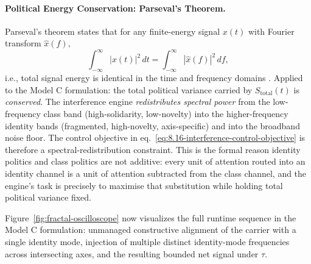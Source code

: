 \paragraph{Political Energy Conservation: Parseval's Theorem.}
Parseval's theorem states that for any finite-energy signal $x(t)$ with Fourier transform $\hat{x}(f)$,
\begin{equation}\label{eq:8.21-parseval}
\int_{-\infty}^{\infty} |x(t)|^{2}\,dt = \int_{-\infty}^{\infty} |\hat{x}(f)|^{2}\,df,
\end{equation}
i.e., total signal energy is identical in the time and frequency domains \cite{oppenheim_schafer_dsp_1999}. Applied to the Model C formulation: the total political variance carried by $S_{\text{total}}(t)$ is \emph{conserved}. The interference engine \emph{redistributes spectral power} from the low-frequency class band (high-solidarity, low-novelty) into the higher-frequency identity bands (fragmented, high-novelty, axis-specific) and into the broadband noise floor. The control objective in eq.~\ref{eq:8.16-interference-control-objective} is therefore a spectral-redistribution constraint. This is the formal reason identity politics and class politics are not additive: every unit of attention routed into an identity channel is a unit of attention subtracted from the class channel, and the engine's task is precisely to maximise that substitution while holding total political variance fixed.

Figure~\ref{fig:fractal-oscilloscope} now visualizes the full runtime sequence in the Model C formulation: unmanaged constructive alignment of the carrier with a single identity mode, injection of multiple distinct identity-mode frequencies across intersecting axes, and the resulting bounded net signal under $\tau$.

